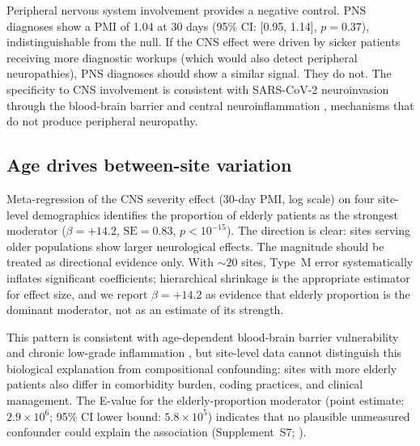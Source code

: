 \documentclass{article}
\begin{document}
Peripheral nervous system involvement provides a negative control.  PNS
diagnoses show a PMI of 1.04 at 30 days (95\% CI: [0.95, 1.14],
$p = 0.37$), indistinguishable from the null.  If the CNS effect were
driven by sicker patients receiving more diagnostic workups (which would
also detect peripheral neuropathies), PNS diagnoses should show a similar
signal.  They do not.  The specificity to CNS involvement is consistent
with SARS-CoV-2 neuroinvasion through the blood-brain barrier
\cite{song2021neuroinvasion} and central neuroinflammation
\cite{iadecola2020covid}, mechanisms that do not produce peripheral
neuropathy.


\subsection{Age drives between-site variation}

Meta-regression of the CNS severity effect (30-day PMI, log scale) on four
site-level demographics identifies the proportion of elderly patients as the
strongest moderator ($\beta = +14.2$, $\text{SE} = 0.83$,
$p < 10^{-15}$).  The direction is clear: sites serving older populations
show larger neurological effects.  The magnitude should be treated as
directional evidence only.  With ${\sim}20$ sites, Type~M error
\cite{gelman2014typeMS} systematically inflates significant coefficients;
hierarchical shrinkage is the appropriate estimator for effect size, and
we report $\beta = +14.2$ as evidence that elderly proportion is the
dominant moderator, not as an estimate of its strength.

This pattern is consistent with age-dependent blood-brain barrier
vulnerability \cite{montagne2015bbb} and chronic low-grade inflammation
\cite{franceschi2018inflammaging}, but site-level data cannot distinguish
this biological explanation from compositional confounding: sites with more
elderly patients also differ in comorbidity burden, coding practices, and
clinical management.  The E-value for the elderly-proportion moderator
(point estimate: $2.9 \times 10^{6}$; 95\% CI lower bound:
$5.8 \times 10^{5}$) indicates that no plausible unmeasured confounder
could explain the association (Supplement~S7; \cite{vanderweele2017}).
\end{document}
